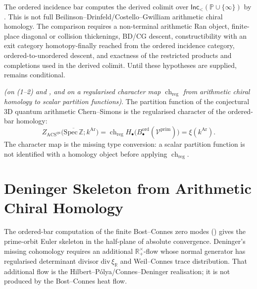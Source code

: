 \begin{remark}
\label{v4-arith:3d-acs:rem:BDCG-form}
The ordered incidence bar computes the derived colimit over
\(\mathsf{Inc}_{<}(\mathbb P\cup\{\infty\})\) by
. This is not full
Beilinson--Drinfeld/Costello--Gwilliam arithmetic chiral homology. The
comparison requires a non-terminal arithmetic Ran object, finite-place
diagonal or collision thickenings, BD/CG descent, constructibility with
an exit category homotopy-finally reached from the ordered incidence
category, ordered-to-unordered descent, and exactness of the restricted
products and completions used in the derived colimit. Until these
hypotheses are supplied,
 remains conditional.
\end{remark}

\begin{corollary}
\label{v4-arith:3d-acs:cor:partition-bar}
\ClaimStatusConditional \emph{(on (1--2)
and , and on a
regularised character map
\(\operatorname{ch}_{\mathrm{reg}}\) from arithmetic chiral homology
to scalar partition functions)}. The partition function of the
conjectural 3D quantum arithmetic Chern--Simons is the regularised
character of the ordered-bar homology:
\begin{equation}
\label{v4-arith:3d-acs:eq:Z-bar}
Z_{\mathrm{ACS}^{\mathrm{qu}}}\bigl(\overline{\mathrm{Spec}\,\mathbb{Z}};k^{\mathrm{Ar}}\bigr)
=
\operatorname{ch}_{\mathrm{reg}}
H_{\bullet}\bigl(B^{\mathrm{ord}}_{\bullet}(\mathcal{V}^{\mathrm{prim}})\bigr)
=\xi(k^{\mathrm{Ar}}).
\end{equation}
The character map is the missing type conversion: a scalar partition
function is not identified with a homology object before applying
\(\operatorname{ch}_{\mathrm{reg}}\).
\end{corollary}

\section{Deninger Skeleton from Arithmetic Chiral Homology}
\label{v4-arith:3d-acs:deninger-chiral}

The ordered-bar computation of the finite Bost--Connes zero modes
() gives the
prime-orbit Euler skeleton in the half-plane of absolute convergence.
Deninger's missing cohomology requires an additional
\(\mathbb R_{+}^{\times}\)-flow whose normal generator has regularised
determinant divisor \(\mathrm{div}\,\xi_{\mathbb R}\) and Weil--Connes
trace distribution. That additional flow is the
Hilbert--P\'olya/Connes--Deninger realisation; it is not produced by
the Bost--Connes heat flow.

